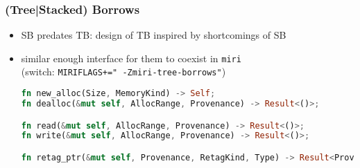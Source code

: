 \begin{frame}[fragile]
    \frametitle{(Tree|Stacked) Borrows}
    \begin{itemize}
        \item SB predates TB: design of TB inspired by shortcomings of SB
        \item similar enough interface for them to coexist in \texttt{miri}\\
            (switch: \texttt{MIRIFLAGS+=" -Zmiri-tree-borrows"})
            \begin{minipage}{0.9\textwidth}
            \begin{block}{}
                \begin{lstlisting}[language=rust, basicstyle=\ttfamily\fontsize{7}{8}\selectfont]
fn new_alloc(Size, MemoryKind) -> Self;
fn dealloc(&mut self, AllocRange, Provenance) -> Result<()>;

fn read(&mut self, AllocRange, Provenance) -> Result<()>;
fn write(&mut self, AllocRange, Provenance) -> Result<()>;

fn retag_ptr(&mut self, Provenance, RetagKind, Type) -> Result<Provenance>;
                \end{lstlisting}
            \end{block}
            \end{minipage}
    \end{itemize}
\end{frame}


